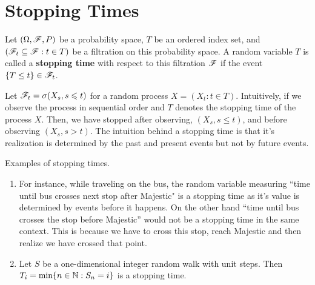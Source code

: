 \documentclass[a4paper,10pt,english]{article}
\begin{document}
\section{Stopping Times}
Let $(\Omega, \mathscr{F}, P)$ be a probability space, $T$ be an ordered index set, and $(\mathscr{F}_t \subseteq \mathscr{F}: t \in T)$ be a filtration on this probability space. 
A random variable $T$ is called a \textbf{stopping time} with respect to this filtration $\mathscr{F}$ if the event $\{T \leq t\} \in \mathscr{F}_t$. %

Let $\mathscr{F}_t = \sigma(X_s, s \leqslant t)$ for a random process $X = (X_t : t \in T)$. 
Intuitively, if we observe the process in sequential order and $T$ denotes the stopping time of the process $X$. 
Then, we have stopped after observing, $(X_s, s \le t)$, and before observing $(X_s, s > t)$. 
The intuition behind a stopping time is that it's realization is determined by the past and present events but not by future events. 
\begin{shaded*}
\begin{exmp} Examples of stopping times.
\begin{enumerate}
\item For instance, while traveling on the bus, the random variable measuring ``time until bus crosses next stop after Majestic" is a stopping time as it's value is determined by events before it happens. 
On the other hand ``time until bus crosses the stop before Majestic'' would not be a stopping time  in the same context. 
This is because we have to cross this stop, reach Majestic and then realize we have crossed that point. 
 \item Let $S$ be a one-dimensional integer random walk with unit steps. 
Then $T_i = \min \{n \in \mathbb{N}: S_n= i\}$ is a stopping time.
\end{enumerate}
\end{exmp}
\end{shaded*}
\end{document}
